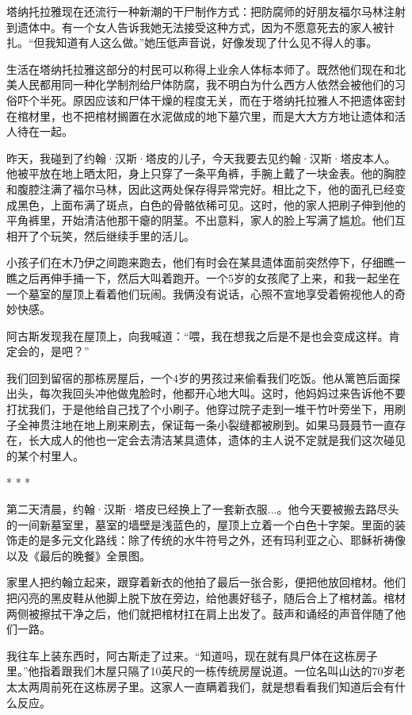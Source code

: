 \documentclass[12pt,oneside]{book}
\begin{document}
\begin{bookref}[frametitle={\cite{好好告别}}]
塔纳托拉雅现在还流行一种新潮的干尸制作方式：把防腐师的好朋友福尔马林注射到遗体中。有一个女人告诉我她无法接受这种方式，因为不愿意死去的家人被针扎。“但我知道有人这么做。”她压低声音说，好像发现了什么见不得人的事。

生活在塔纳托拉雅这部分的村民可以称得上业余人体标本师了。既然他们现在和北美人民都用同一种化学制剂给尸体防腐，我不明白为什么西方人依然会被他们的习俗吓个半死。原因应该和尸体干燥的程度无关，而在于塔纳托拉雅人不把遗体密封在棺材里，也不把棺材搁置在水泥做成的地下墓穴里，而是大大方方地让遗体和活人待在一起。

昨天，我碰到了约翰·汉斯·塔皮的儿子，今天我要去见约翰·汉斯·塔皮本人。他被平放在地上晒太阳，身上只穿了一条平角裤，手腕上戴了一块金表。他的胸腔和腹腔注满了福尔马林，因此这两处保存得异常完好。相比之下，他的面孔已经变成黑色，上面布满了斑点，白色的骨骼依稀可见。这时，他的家人把刷子伸到他的平角裤里，开始清洁他那干瘪的阴茎。不出意料，家人的脸上写满了尴尬。他们互相开了个玩笑，然后继续手里的活儿。

小孩子们在木乃伊之间跑来跑去，他们有时会在某具遗体面前突然停下，仔细瞧一瞧之后再伸手捅一下，然后大叫着跑开。一个5岁的女孩爬了上来，和我一起坐在一个墓室的屋顶上看着他们玩闹。我俩没有说话，心照不宣地享受着俯视他人的奇妙快感。

阿古斯发现我在屋顶上，向我喊道：“喂，我在想我之后是不是也会变成这样。肯定会的，是吧？”

我们回到留宿的那栋房屋后，一个4岁的男孩过来偷看我们吃饭。他从篱笆后面探出头，每次我回头冲他做鬼脸时，他都开心地大叫。这时，他妈妈过来告诉他不要打扰我们，于是他给自己找了个小刷子。他穿过院子走到一堆干竹叶旁坐下，用刷子全神贯注地在地上刷来刷去，保证每一条小裂缝都被刷到。如果马聂聂节一直存在，长大成人的他也一定会去清洁某具遗体，遗体的主人说不定就是我们这次碰见的某个村里人。

\begin{center}
* * *
\end{center}

第二天清晨，约翰·汉斯·塔皮已经换上了一套新衣服...。他今天要被搬去路尽头的一间新墓室里，墓室的墙壁是浅蓝色的，屋顶上立着一个白色十字架。里面的装饰走的是多元文化路线：除了传统的水牛符号之外，还有玛利亚之心、耶稣祈祷像以及《最后的晚餐》全景图。

家里人把约翰立起来，跟穿着新衣的他拍了最后一张合影，便把他放回棺材。他们把闪亮的黑皮鞋从他脚上脱下放在旁边，给他裹好毯子，随后合上了棺材盖。棺材两侧被擦拭干净之后，他们就把棺材扛在肩上出发了。鼓声和诵经的声音伴随了他们一路。

我往车上装东西时，阿古斯走了过来。“知道吗，现在就有具尸体在这栋房子里。”他指着跟我们木屋只隔了10英尺的一栋传统房屋说道。一位名叫山达的70岁老太太两周前死在这栋房子里。这家人一直瞒着我们，就是想看看我们知道后会有什么反应。


\end{bookref}
\end{document}
